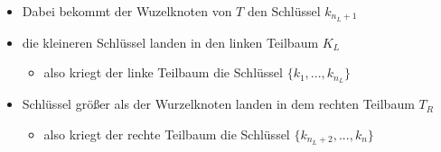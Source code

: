 \begin{itemize}
	\item Dabei bekommt der Wuzelknoten von $T$ den Schlüssel $k_{n_{L}+1}$
	\item die kleineren Schlüssel landen in den linken Teilbaum $K_{L}$
	\begin{itemize}
		\item also kriegt der linke Teilbaum die Schlüssel $\{k_{1},...,k_{n_{L}}\}$
	\end{itemize}
	\item Schlüssel größer als der Wurzelknoten landen in dem rechten Teilbaum $T_{R}$
	\begin{itemize}
		\item also kriegt der rechte Teilbaum die Schlüssel $\{k_{n_{L}+2},...,k_{n}\}$
	\end{itemize}
\end{itemize}














